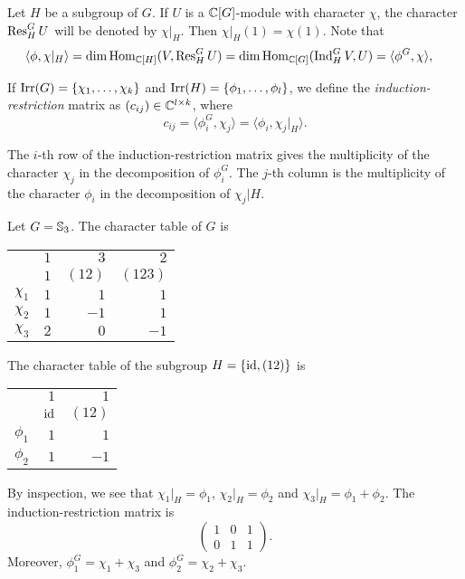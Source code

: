 
Let $H$ be a subgroup of $G$. If $U$ is a $\mathbb{C}[G]$-module with character $\chi$, the character $\operatorname{Res}_H^GU$ will be denoted by $\chi|_H$. Then $\chi|_H(1)=\chi(1)$. Note that 
\begin{align*}
\langle \phi,\chi|_H\rangle
&=\dim\operatorname{Hom}_{\mathbb{C}[H]}(V,\operatorname{Res}_H^GU)
=\dim\operatorname{Hom}_{\mathbb{C}[G]}(\operatorname{Ind}_H^GV,U)
=\langle\phi^G,\chi\rangle,
\end{align*}


\begin{definition}
If $\operatorname{Irr}(G)=\{\chi_1,\dots,\chi_k\}$ and $\operatorname{Irr}(H)=\{\phi_1,\dots,\phi_l\}$, we define the \emph{induction-restriction} matrix as $(c_{ij})\in\mathbb{C}^{l\times k}$, where 
\[
c_{ij}=\langle \phi_i^G,\chi_j\rangle=\langle\phi_i,\chi_j|_H\rangle.
\]
\end{definition}

The $i$-th row of the induction-restriction matrix gives the multiplicity of the character $\chi_j$ in the decomposition of $\phi_i^G$. The $j$-th column is the multiplicity of the 
character $\phi_i$ in the decomposition of $\chi_j|H$.

\begin{example}
Let $G=\mathbb{S}_3$. 
The character table of $G$ is 
	\begin{center}
		\begin{tabular}{|c|rrr|}
			\hline
			& $1$ & $3$ & $2$\tabularnewline
			& $1$ & $(12)$ & $(123)$ \tabularnewline
			\hline 
			$\chi_{1}$ & $1$ & $1$ & $1$\tabularnewline
			$\chi_{2}$ & $1$ & $-1$ & $1$ \tabularnewline
			$\chi_{3}$ & $2$ & $0$ & $-1$ \tabularnewline
			\hline
		\end{tabular}
	\end{center}
The character table of the subgroup $H=\{\operatorname{id},(12)\}$ is  
\begin{center}
\begin{tabular}{|c|rr|}
\hline 
& $1$ & $1$ \tabularnewline
& $\operatorname{id}$ & $(12)$ \tabularnewline
\hline 
$\phi_{1}$ & $1$ & $1$ \tabularnewline
$\phi_{2}$ & $1$ & $-1$\tabularnewline
\hline
\end{tabular}
\end{center}
By inspection, we see that
$\chi_1|_H=\phi_1$, $\chi_2|_H=\phi_2$ and 
$\chi_3|_H=\phi_1+\phi_2$. 
The induction-restriction matrix is 
\[
\begin{pmatrix}
1 & 0 & 1\\
0 & 1 & 1
\end{pmatrix}.
\]
Moreover, $\phi_1^G=\chi_1+\chi_3$ and  $\phi_2^G=\chi_2+\chi_3$. 
\end{example}

